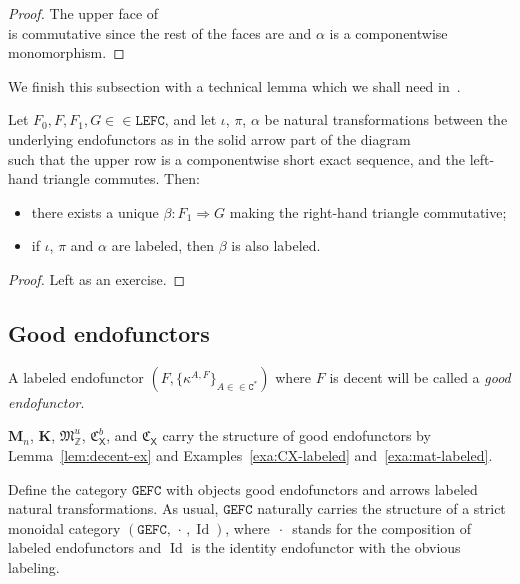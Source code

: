 \documentclass[10pt]{simplearticle}
\newcommand{\tikzinput}[1]{}
\newcommand{\Id}{\operatorname{Id}}
\newcommand{\GEFC}{\mathbb{\mathtt{GEFC}}}
\newcommand{\LEFC}{\mathbb{\mathtt{LEFC}}}
\newcommand{\Cstar}{\mathtt{C^{*}}}
\newcommand{\C}{\mathfrak{C}^{\,}}
\newcommand{\fK}{\mathbf{K}}
\newcommand{\fM}{\mathbf{M}}
\newcommand{\singledot}{\,\cdot\,}
\begin{document}
\begin{proof}
The upper face of
\[
\tikzinput{d468}
\]
is commutative since the rest of the faces are and $\alpha$ is a
componentwise monomorphism.
\end{proof}

We finish this subsection with a technical lemma which we shall need
in~\cite{makeev_asadj}.
\begin{lem}\label{lem:27}
Let $F_{0},F,F_{1},G\in\in\LEFC$, and let $\iota$,
$\pi$, $\alpha$ be natural transformations between the underlying
endofunctors as in the solid arrow part of the diagram
\[
\tikzinput{d469}
\]
such that the upper row is a componentwise short exact sequence, and
the left-hand triangle commutes. Then:
\begin{itemize}
\item there exists a unique $\beta\colon F_{1}\Rightarrow G$ making the
right-hand triangle commutative;
\item if $\iota$, $\pi$ and $\alpha$ are labeled, then $\beta$ is also
labeled.
\end{itemize}
\end{lem}

\begin{proof}
Left as an exercise.
\end{proof}

\subsection{Good endofunctors}
\begin{defn}
A labeled endofunctor $(F,\{\kappa^{A,F}\}_{A\in\in\Cstar})$ where
$F$ is decent will be called a \emph{good endofunctor}.
\end{defn}

\begin{example}\label{exa:good-endfs}
$\fM_{n}$,
$\fK$, $\mathfrak{M}^{u}_{\mathbb{Z}}$,
$\mathfrak{C}^{b}_{\mathsf{X}}$, and $\C_{\mathsf{X}}$ carry the
structure of good endofunctors by Lemma~\ref{lem:decent-ex} and
Examples~\ref{exa:CX-labeled} and~\ref{exa:mat-labeled}.
\end{example}

\begin{defn}
Define the category $\GEFC$ with objects good endofunctors and arrows
labeled natural transformations. As usual, $\GEFC$ naturally carries
the structure of a strict monoidal category $(\GEFC,\singledot,\Id)$,
where $\singledot$ stands for the composition of labeled endofunctors
and $\Id$ is the identity endofunctor with the obvious labeling.
\end{defn}
\end{document}
